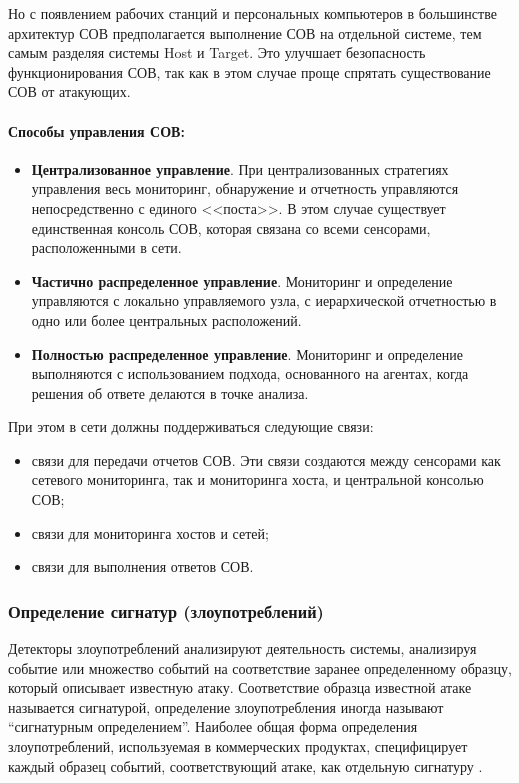 Но с появлением рабочих станций и персональных компьютеров в большинстве архитектур
СОВ предполагается выполнение СОВ на отдельной системе, тем самым разделяя системы
Host и Target. Это улучшает безопасность функционирования СОВ, так как в этом случае
проще спрятать существование СОВ от атакующих.

\paragraph*{Способы управления СОВ:}

\begin{itemize}
	\item \textbf{Централизованное управление}. При централизованных стратегиях управления
	весь мониторинг, обнаружение и отчетность управляются непосредственно с единого <<поста>>.
	В этом случае существует единственная консоль СОВ, которая связана со всеми сенсорами,
	расположенными в сети.

	\item \textbf{Частично распределенное управление}. Мониторинг и определение управляются
	с локально управляемого узла, с иерархической отчетностью в одно или более центральных
	расположений.

	\item \textbf{Полностью распределенное управление}. Мониторинг и определение выполняются
	с использованием подхода, основанного на агентах, когда решения об ответе делаются в
	точке анализа.
\end{itemize}

При этом в сети должны поддерживаться следующие связи:

\begin{itemize}
	\item связи для передачи отчетов СОВ. Эти связи создаются между сенсорами как сетевого
	мониторинга, так и мониторинга хоста, и центральной консолью СОВ;

	\item связи для мониторинга хостов и сетей;

	\item связи для выполнения ответов СОВ.
\end{itemize}

\subsubsection{Определение сигнатур (злоупотреблений)}

Детекторы злоупотреблений анализируют деятельность системы, анализируя событие или множество событий на соответствие заранее определенному образцу, который описывает известную атаку. Соответствие образца известной атаке называется сигнатурой, определение злоупотребления иногда называют ``сигнатурным определением''. Наиболее общая форма определения злоупотреблений, используемая в коммерческих продуктах, специфицирует каждый образец событий, соответствующий атаке, как отдельную сигнатуру \autocite{IntrusionDetectionSystemsMsu}.

